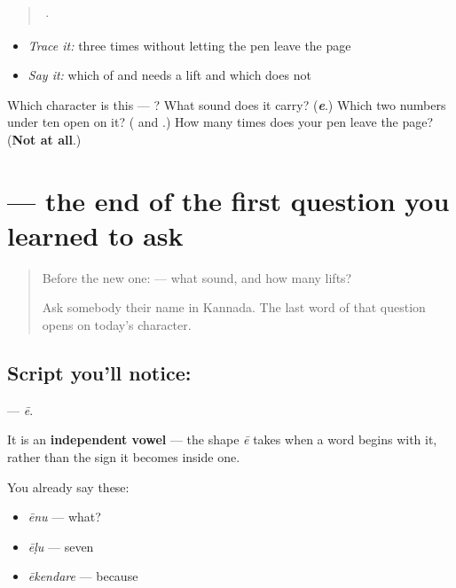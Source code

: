 \begin{quote}
  ·  
\end{quote}

\begin{itemize}
\raggedright
  \item \emph{Trace it:}  three times without letting the pen leave the page
  \item \emph{Say it:} which of  and  needs a lift and which does not
\end{itemize}

\begin{tcolorbox}[breakable,colback=teal!4,colframe=teal!35!black,title={Before you move on}]
Which character is this — ? What sound does it carry? (\emph{\textbf{e}}.) Which two numbers under ten open on it? (\textbf{} and \textbf{}.) How many times does your pen leave the page? (\textbf{Not at all}.)
\end{tcolorbox}
\section[\texorpdfstring{\kn{ಏ} (ē)}{ಏ (ē)}]{ — the end of the first question you learned to ask}

\label{lesson:KA-S157-letter-ee}



\begin{quote}
Before the new one:  — what sound, and how many lifts?

Ask somebody their name in Kannada. The last word of that question opens on today's character.
\end{quote}

\subsection*{Script you'll notice: }
\textbf{} — \emph{ē}.

It is an \textbf{independent vowel} — the shape \emph{ē} takes when a word begins with it, rather than the sign it becomes inside one.

You already say these:

\begin{itemize}
\raggedright
  \item \textbf{} \emph{ēnu} — what?
  \item \textbf{} \emph{ēḷu} — seven
  \item \textbf{} \emph{ēkendare} — because
\end{itemize}


